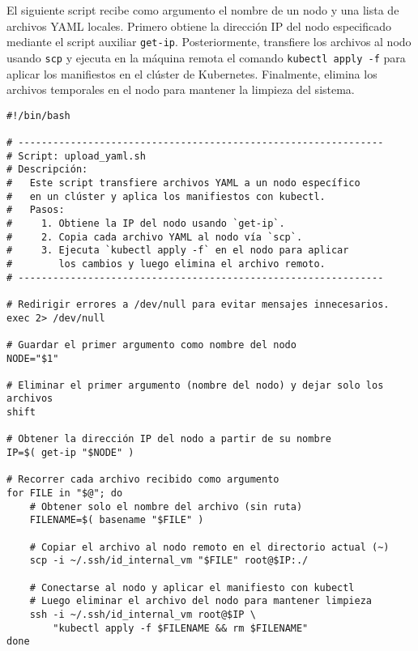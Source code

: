 El siguiente script recibe como argumento el nombre de un nodo y una lista de archivos YAML locales. Primero obtiene la dirección IP del nodo especificado mediante el script auxiliar \texttt{get-ip}. Posteriormente, transfiere los archivos al nodo usando \texttt{scp} y ejecuta en la máquina remota el comando \texttt{kubectl apply -f} para aplicar los manifiestos en el clúster de Kubernetes. Finalmente, elimina los archivos temporales en el nodo para mantener la limpieza del sistema.

\begin{verbatim}
#!/bin/bash

# ---------------------------------------------------------------
# Script: upload_yaml.sh
# Descripción:
#   Este script transfiere archivos YAML a un nodo específico 
#   en un clúster y aplica los manifiestos con kubectl.
#   Pasos:
#     1. Obtiene la IP del nodo usando `get-ip`.
#     2. Copia cada archivo YAML al nodo vía `scp`.
#     3. Ejecuta `kubectl apply -f` en el nodo para aplicar
#        los cambios y luego elimina el archivo remoto.
# ---------------------------------------------------------------

# Redirigir errores a /dev/null para evitar mensajes innecesarios.
exec 2> /dev/null

# Guardar el primer argumento como nombre del nodo
NODE="$1"

# Eliminar el primer argumento (nombre del nodo) y dejar solo los archivos
shift

# Obtener la dirección IP del nodo a partir de su nombre
IP=$( get-ip "$NODE" )

# Recorrer cada archivo recibido como argumento
for FILE in "$@"; do
    # Obtener solo el nombre del archivo (sin ruta)
    FILENAME=$( basename "$FILE" )

    # Copiar el archivo al nodo remoto en el directorio actual (~)
    scp -i ~/.ssh/id_internal_vm "$FILE" root@$IP:./

    # Conectarse al nodo y aplicar el manifiesto con kubectl
    # Luego eliminar el archivo del nodo para mantener limpieza
    ssh -i ~/.ssh/id_internal_vm root@$IP \
        "kubectl apply -f $FILENAME && rm $FILENAME"
done
\end{verbatim}